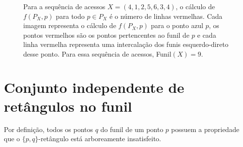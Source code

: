 \begin{figure}
\caption{Para a sequência de acessos $X = (4,1,2,5,6,3,4)$, o cálculo de $f(P_X,p)$ para todo $p \in P_X$ é o número de linhas vermelhas. Cada imagem representa o cálculo de $f(P_X,p)$ para o ponto azul $p$, os pontos vermelhos são os pontos pertencentes ao funil de $p$ e cada linha vermelha representa uma intercalação dos funis esquerdo-direto desse ponto. Para essa sequência de acessos, Funil$(X) = 9$.}
\end{figure}

\section{Conjunto independente de retângulos no funil}

Por definição, todos os pontos $q$ do funil de um ponto $p$ possuem a propriedade que o $\{p,q\}$-retângulo está arboreamente insatisfeito.